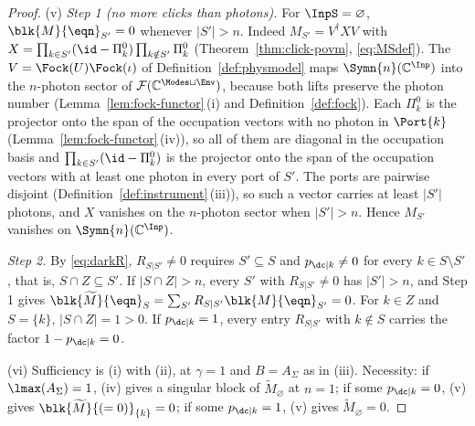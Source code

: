 \begin{proof}
(v) \emph{Step 1 (no more clicks than photons).} For $\InpS=\varnothing$,
$\blk{M}{\eqn}_{S'}=0$ whenever $|S'|>n$. Indeed
$M_{S'}=V^\dagger X V$ with
$X=\prod_{k\in S'}(\id-\Pi^0_k)\prod_{k\notin S'}\Pi^0_k$
(Theorem~\ref{thm:click-povm}, \eqref{eq:MSdef}). The 
$V=\Fock(U)\Fock(\iota)$ of Definition~\ref{def:physmodel} maps
$\Symn{n}(\mathbb{C}^{\Inp})$ into the $n$-photon sector of
$\mathcal{F}(\mathbb{C}^{\Modes\sqcup\Env})$, because both lifts preserve the
photon number (Lemma~\ref{lem:fock-functor}\,(i) and Definition~\ref{def:fock}).
Each $\Pi^0_k$ is the projector onto the span of the occupation vectors with
no photon in $\Port{k}$ (Lemma~\ref{lem:fock-functor}\,(iv)), so all of them
are diagonal in the occupation basis and $\prod_{k\in S'}(\id-\Pi^0_k)$ is the
projector onto the span of the occupation vectors with at least one photon in
every port of $S'$. The ports are pairwise disjoint
(Definition~\ref{def:instrument}\,(iii)), so such a vector carries at least
$|S'|$ photons, and $X$ vanishes on the $n$-photon sector when $|S'|>n$. Hence
$M_{S'}$ vanishes on $\Symn{n}(\mathbb{C}^{\Inp})$.

\emph{Step 2.} By \eqref{eq:darkR}, $R_{S|S'}\neq0$ requires $S'\subseteq S$
and $p_{\dc|k}\neq0$ for every $k\in S\setminus S'$, that is,
$S\cap Z\subseteq S'$. If $|S\cap Z|>n$, every $S'$ with $R_{S|S'}\neq0$ has
$|S'|>n$, and Step 1 gives
$\blk{\widetilde M}{\eqn}_S=\sum_{S'}R_{S|S'}\blk{M}{\eqn}_{S'}=0$. For
$k\in Z$ and $S=\{k\}$, $|S\cap Z|=1>0$. If $p_{\dc|k}=1$, every entry
$R_{S|S'}$ with $k\notin S$ carries the factor $1-p_{\dc|k}=0$.

(vi) Sufficiency is (i) with (ii), at $\gamma=1$ and $B=A_\Sigma$ as in (iii).
Necessity: if $\lmax(A_\Sigma)=1$, (iv) gives a singular block of
$\widetilde M_\varnothing$ at $n=1$; if some $p_{\dc|k}=0$, (v) gives
$\blk{\widetilde M}{(=0)}_{\{k\}}=0$; if some $p_{\dc|k}=1$, (v) gives
$\widetilde M_\varnothing=0$.
\end{proof}
